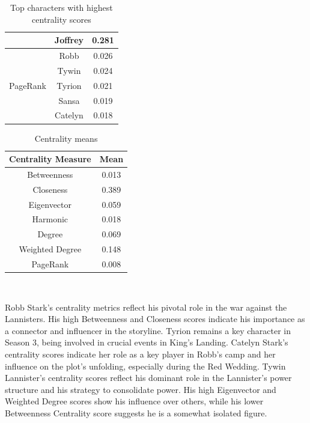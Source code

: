 \documentclass[10pt,twocolumn,letterpaper]{article}
\begin{document}
\begin{table}[!h]
\begin{tabular}{c|c|c}
                    & Joffrey & 0.281 \\
        \hline
                    & Robb & 0.026 \\
                    & Tywin & 0.024 \\
        PageRank    & Tyrion & 0.021 \\
                    & Sansa & 0.019 \\
                    & Catelyn & 0.018 \\
        \hline
    \end{tabular}
    \vspace{0.2cm}
    \caption{Top characters with highest centrality scores}
    \label{tab:cent_s2}
\end{table}




\begin{table}[!h]
    \centering
    \small
    \begin{tabular}{c|c}
        Centrality Measure & Mean  \\
        \hline
        Betweenness & 0.013 \\
        Closeness & 0.389 \\
        Eigenvector & 0.059 \\
        Harmonic & 0.018 \\
        Degree & 0.069 \\
        Weighted Degree & 0.148 \\
        PageRank & 0.008 \\
        \hline 
    \end{tabular} \\
    \caption{Centrality means}
    \label{tab:cent_means_s2}
\end{table}

Robb Stark’s centrality metrics reflect his pivotal role in the war against the Lannisters. His high Betweenness and Closeness scores indicate his importance as a connector and influencer in the storyline. Tyrion remains a key character in Season 3, being involved in crucial events in King’s Landing. Catelyn Stark’s centrality scores indicate her role as a key player in Robb’s camp and her influence on the plot’s unfolding, especially during the Red Wedding. Tywin Lannister's centrality scores reflect his dominant role in the Lannister’s power structure and his strategy to consolidate power. His high Eigenvector and Weighted Degree scores show his influence over others, while his lower Betweenness Centrality score suggests he is a somewhat isolated figure.
\end{document}

